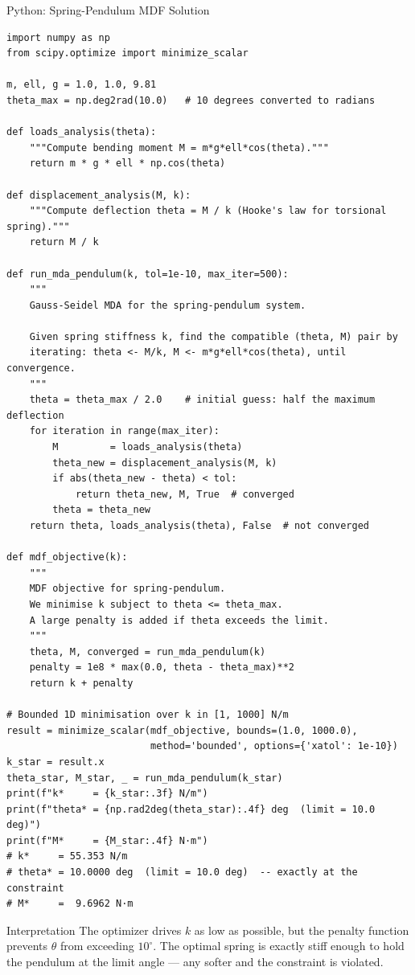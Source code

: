 \documentclass[aspectratio=169,10pt]{beamer}
\begin{document}
\begin{frame}[fragile]{Python: Spring-Pendulum MDF Solution}

  \begin{lstlisting}[style=python]
import numpy as np
from scipy.optimize import minimize_scalar

m, ell, g = 1.0, 1.0, 9.81
theta_max = np.deg2rad(10.0)   # 10 degrees converted to radians

def loads_analysis(theta):
    """Compute bending moment M = m*g*ell*cos(theta)."""
    return m * g * ell * np.cos(theta)

def displacement_analysis(M, k):
    """Compute deflection theta = M / k (Hooke's law for torsional spring)."""
    return M / k

def run_mda_pendulum(k, tol=1e-10, max_iter=500):
    """
    Gauss-Seidel MDA for the spring-pendulum system.

    Given spring stiffness k, find the compatible (theta, M) pair by
    iterating: theta <- M/k, M <- m*g*ell*cos(theta), until convergence.
    """
    theta = theta_max / 2.0    # initial guess: half the maximum deflection
    for iteration in range(max_iter):
        M         = loads_analysis(theta)
        theta_new = displacement_analysis(M, k)
        if abs(theta_new - theta) < tol:
            return theta_new, M, True  # converged
        theta = theta_new
    return theta, loads_analysis(theta), False  # not converged

def mdf_objective(k):
    """
    MDF objective for spring-pendulum.
    We minimise k subject to theta <= theta_max.
    A large penalty is added if theta exceeds the limit.
    """
    theta, M, converged = run_mda_pendulum(k)
    penalty = 1e8 * max(0.0, theta - theta_max)**2
    return k + penalty

# Bounded 1D minimisation over k in [1, 1000] N/m
result = minimize_scalar(mdf_objective, bounds=(1.0, 1000.0),
                         method='bounded', options={'xatol': 1e-10})
k_star = result.x
theta_star, M_star, _ = run_mda_pendulum(k_star)
print(f"k*     = {k_star:.3f} N/m")
print(f"theta* = {np.rad2deg(theta_star):.4f} deg  (limit = 10.0 deg)")
print(f"M*     = {M_star:.4f} N·m")
# k*     = 55.353 N/m
# theta* = 10.0000 deg  (limit = 10.0 deg)  -- exactly at the constraint
# M*     =  9.6962 N·m
  \end{lstlisting}

  \begin{block}{Interpretation}
    The optimizer drives $k$ as low as possible, but the penalty
    function prevents $\theta$ from exceeding $10^\circ$.  The optimal
    spring is exactly stiff enough to hold the pendulum at the
    limit angle --- any softer and the constraint is violated.
  \end{block}

\end{frame}
\end{document}
